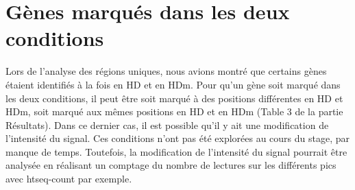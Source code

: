 \documentclass[a4paper,12pt,times]{report}
\begin{document}
   \section {Gènes marqués dans les deux conditions}
   Lors de l'analyse des régions uniques, nous avions montré que certains gènes étaient identifiés à la fois en HD et en HDm. 
   Pour qu'un gène soit marqué dans les deux conditions, il peut être soit marqué à des positions différentes en HD et HDm, soit marqué aux mêmes positions en HD et en HDm (Table 3 de la partie Résultats). Dans ce dernier cas, il est possible qu'il y ait une modification de l'intensité du signal. Ces conditions n'ont pas été explorées au cours du stage, par manque de temps. Toutefois, la modification de l'intensité du signal pourrait être analysée en réalisant un comptage du nombre de lectures sur les différents pics avec htseq-count \cite{Htseqcount} par exemple.
\end{document}
